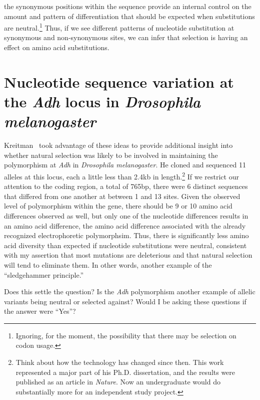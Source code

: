 \noindent the synonymous positions within the sequence provide an
internal control on the amount and pattern of differentiation that
should be expected when substitutions are neutral.\footnote{Ignoring,
  for the moment, the possibility that there may be selection on codon
  usage.}  Thus, if we see different patterns of nucleotide
substitution at synonymous and non-synonymous sites, we can infer that
selection is having an effect on amino acid substitutions.

\section*{Nucleotide sequence variation at the {\it Adh\/} locus in
  {\it Drosophila melanogaster}}

Kreitman~\cite{Kreitman83} took advantage of these ideas to provide
additional insight into whether natural selection was likely to be
involved in maintaining the polymorphism at {\it Adh\/} in {\it
  Drosophila melanogaster}. He cloned and sequenced 11 alleles at this
locus, each a little less than 2.4kb in length.\footnote{Think about
  how the technology has changed since then. This work represented a
  major part of his Ph.D. dissertation, and the results were published
  as an article in {\it Nature}. Now an undergraduate would do
  substantially more for an independent study project.} If we restrict
our attention to the coding region, a total of 765bp, there were 6
distinct sequences that differed from one another at between 1 and 13
sites. Given the observed level of polymorphism within the gene, there
should be 9 or 10 amino acid differences observed as well, but only
one of the nucleotide differences results in an amino acid difference,
the amino acid difference associated with the already recognized
electrophoretic polymorphsim. Thus, there is significantly less amino
acid diversity than expected if nucleotide substitutions were neutral,
consistent with my assertion that most mutations are deleterious and
that natural selection will tend to eliminate
them. In other words, another example
of the ``sledgehammer principle.''

Does this settle the question? Is the {\it Adh\/} polymorphism another
example of allelic variants being neutral or selected against? Would I
be asking these questions if the answer were ``Yes''?

